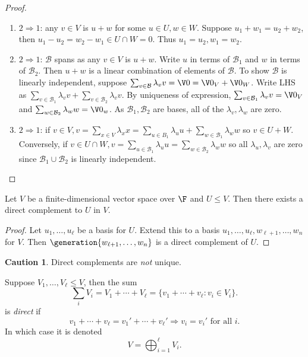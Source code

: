 \documentclass[a4paper]{article}
\newcommand*{\spans}{\generation}
\newcommand*{\basis}{\mathcal}
\theoremstyle{definition}
\newtheorem*{caution}{Caution}
\begin{document}
\begin{proof}\leavevmode
  \begin{enumerate}
  \item \(2 \Rightarrow 1\): any \(v\in V\) is \(u+w\) for some \(u\in U, w\in W\). Suppose \(u_1+w_1=u_2+w_2\), then \(u_1-u_2 = w_2-w_1 \in U\cap W = 0\). Thus \(u_1=u_2,w_1=w_2\).
  \item \(2 \Rightarrow 1\): \(\basis B\) spans as any \(v\in V\) is \(u+w\). Write \(u\) in terms of \(\basis B_1\) and \(w\) in terms of \(\basis B_2\). Then \(u+w\) is a linear combination of elements of \(\basis B\). To show \(\basis B\) is linearly independent, suppose \(\sum_{v\in \basis B} \lambda_v v = \V 0 = \V 0_V + \V 0_W\). Write LHS as \(\sum_{v\in \basis B_1} \lambda_vv + \sum_{v\in \basis B_2}\lambda_vv\). By uniqueness of expression, \(\sum_{v\in \basis B_1}\lambda_vv=\V 0_V\) and \(\sum_{w\in \basis B_2}\lambda_ww=\V 0_w\). As \(\basis B_1, \basis B_2\) are bases, all of the \(\lambda_v, \lambda_w\) are zero.
  \item \(2 \Rightarrow 1\): if \(v\in V, v=\sum_{x\in V}\lambda_xx = \sum_{u\in B_1}\lambda_uu + \sum_{w\in \basis B_1}\lambda_ww\) so \(v\in U+W\). Conversely, if \(v\in U\cap W, v = \sum_{u\in \basis B_1}\lambda_uu=\sum_{w\in \basis B_2}\lambda_ww\) so all \(\lambda_u, \lambda_v\) are zero since \(\basis B_1\cup \basis B_2\) is linearly independent.
  \end{enumerate}
\end{proof}

\begin{lemma}
  Let \(V\) be a finite-dimensional vector space over \(\F\) and \(U\leq V\). Then there exists a direct complement to \(U\) in \(V\).
\end{lemma}

\begin{proof}
  Let \(u_1,\ldots, u_\ell\) be a basis for \(U\). Extend this to a basis \(u_1,\ldots, u_\ell,w_{\ell+1},\ldots,w_n\) for \(V\). Then \(\spans{w_{\ell+1},\ldots,w_n}\) is a direct complement of \(U\).
\end{proof}

\begin{caution}
  Direct complements are \emph{not} unique.
\end{caution}

\begin{definition}
  Suppose \(V_1,\ldots, V_\ell \leq V\), then the sum
  \[
    \sum_i V_i = V_1+\cdots+V_\ell = \{v_1+\cdots+v_\ell: v_i\in V_i\}.
  \]
  is \emph{direct} if
  \[
    v_1+\cdots+v_\ell = v_1'+\cdots+ v_\ell' \Rightarrow v_i = v_i' \text{ for all } i.
  \]
  In which case it is denoted
  \[
    V = \bigoplus_{i=1}^\ell V_i.
  \]
\end{definition}
\end{document}
